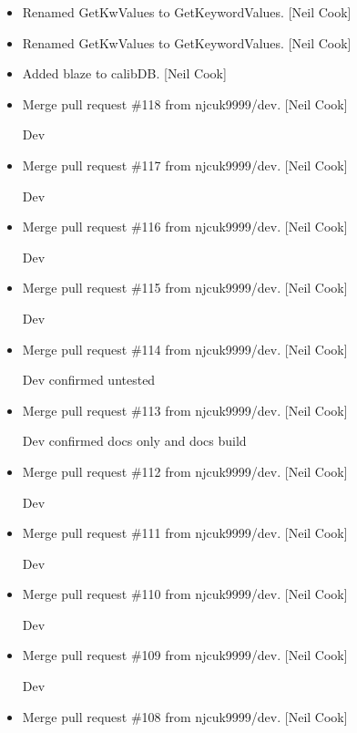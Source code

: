 \documentclass[a4paper,10pt,english]{report}
\begin{document}
\begin{itemize}
\item {} 
Renamed GetKwValues to GetKeywordValues. {[}Neil Cook{]}

\item {} 
Renamed GetKwValues to GetKeywordValues. {[}Neil Cook{]}

\item {} 
Added blaze to calibDB. {[}Neil Cook{]}

\item {} 
Merge pull request \#118 from njcuk9999/dev. {[}Neil Cook{]}

Dev

\item {} 
Merge pull request \#117 from njcuk9999/dev. {[}Neil Cook{]}

Dev

\item {} 
Merge pull request \#116 from njcuk9999/dev. {[}Neil Cook{]}

Dev

\item {} 
Merge pull request \#115 from njcuk9999/dev. {[}Neil Cook{]}

Dev

\item {} 
Merge pull request \#114 from njcuk9999/dev. {[}Neil Cook{]}

Dev \sphinxhyphen{} confirmed untested

\item {} 
Merge pull request \#113 from njcuk9999/dev. {[}Neil Cook{]}

Dev \sphinxhyphen{} confirmed docs only and docs build

\item {} 
Merge pull request \#112 from njcuk9999/dev. {[}Neil Cook{]}

Dev

\item {} 
Merge pull request \#111 from njcuk9999/dev. {[}Neil Cook{]}

Dev

\item {} 
Merge pull request \#110 from njcuk9999/dev. {[}Neil Cook{]}

Dev

\item {} 
Merge pull request \#109 from njcuk9999/dev. {[}Neil Cook{]}

Dev

\item {} 
Merge pull request \#108 from njcuk9999/dev. {[}Neil Cook{]}


\end{itemize}
\end{document}
